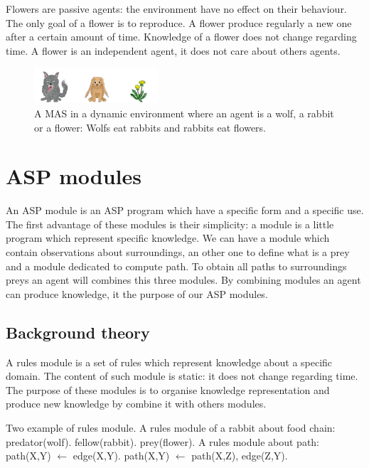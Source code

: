 \documentclass{aamas2012}
\begin{document}
	Flowers are passive agents: the environment have no effect on their behaviour.
	The only goal of a flower is to reproduce.
	A flower produce regularly a new one after a certain amount of time.
	Knowledge of a flower does not change regarding time.
	A flower is an independent agent, it does not care about others agents.

	\begin{figure}
		\centering
		\includegraphics[keepaspectratio=true,scale=3.0]{food_chain.pdf}
		\caption
		{
			\label{food_chain}
			A MAS in a dynamic environment where an agent is a wolf, a rabbit or a flower:
			Wolfs eat rabbits and rabbits eat flowers.
		}
	\end{figure}

\section{ASP modules}

	An ASP module is an ASP program which have a specific form and a specific use.
	The first advantage of these modules is their simplicity: a module is a little program which represent specific knowledge.
	We can have a module which contain observations about surroundings,
	an other one to define what is a prey and a module dedicated to compute path.
	To obtain all paths to surroundings preys an agent will combines this three modules.
	By combining modules an agent can produce knowledge, it the purpose of our ASP modules.

\subsection{Background theory}

	\begin{definition}
		A rules module is a set of rules which represent knowledge about a specific domain.
		The content of such module is static: it does not change regarding time.
		The purpose of these modules is to organise knowledge representation and produce
		new knowledge by combine it with others modules.
	\end{definition}
	
	\begin{example}
		Two example of rules module.\newline
		A rules module of a rabbit about food chain:\newline
		\newline
		predator(wolf).\newline
		fellow(rabbit).\newline
		prey(flower).\newline
		\newline
		A rules module about path:\newline
		\newline
		path(X,Y) $\leftarrow$ edge(X,Y).\newline
		path(X,Y) $\leftarrow$ path(X,Z), edge(Z,Y).
	\end{example}
\end{document}
